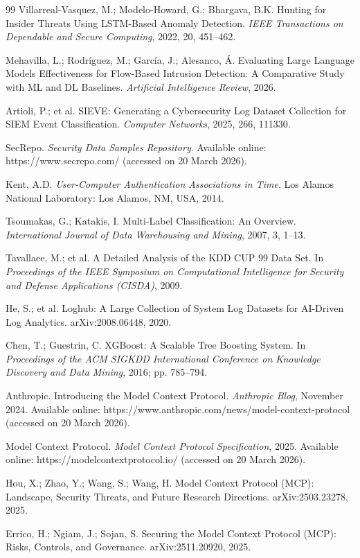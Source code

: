 \documentclass[12pt,oneside]{report}
\begin{document}
\begin{thebibliography}{99}
Villarreal-Vasquez, M.; Modelo-Howard, G.; Bhargava, B.K. Hunting for Insider Threats Using LSTM-Based Anomaly Detection. \textit{IEEE Transactions on Dependable and Secure Computing}, 2022, 20, 451--462.

Mehavilla, L.; Rodr\'{i}guez, M.; Garc\'{i}a, J.; Alesanco, \'{A}. Evaluating Large Language Models Effectiveness for Flow-Based Intrusion Detection: A Comparative Study with ML and DL Baselines. \textit{Artificial Intelligence Review}, 2026.

Artioli, P.; et al. SIEVE: Generating a Cybersecurity Log Dataset Collection for SIEM Event Classification. \textit{Computer Networks}, 2025, 266, 111330.

SecRepo. \textit{Security Data Samples Repository}. Available online: https://www.secrepo.com/ (accessed on 20 March 2026).

Kent, A.D. \textit{User-Computer Authentication Associations in Time}. Los Alamos National Laboratory: Los Alamos, NM, USA, 2014.

Tsoumakas, G.; Katakis, I. Multi-Label Classification: An Overview. \textit{International Journal of Data Warehousing and Mining}, 2007, 3, 1--13.

Tavallaee, M.; et al. A Detailed Analysis of the KDD CUP 99 Data Set. In \textit{Proceedings of the IEEE Symposium on Computational Intelligence for Security and Defense Applications (CISDA)}, 2009.

He, S.; et al. Loghub: A Large Collection of System Log Datasets for AI-Driven Log Analytics. arXiv:2008.06448, 2020.

Chen, T.; Guestrin, C. XGBoost: A Scalable Tree Boosting System. In \textit{Proceedings of the ACM SIGKDD International Conference on Knowledge Discovery and Data Mining}, 2016; pp. 785--794.

Anthropic. Introducing the Model Context Protocol. \textit{Anthropic Blog}, November 2024. Available online: https://www.anthropic.com/news/model-context-protocol (accessed on 20 March 2026).

Model Context Protocol. \textit{Model Context Protocol Specification}, 2025. Available online: https://modelcontextprotocol.io/ (accessed on 20 March 2026).

Hou, X.; Zhao, Y.; Wang, S.; Wang, H. Model Context Protocol (MCP): Landscape, Security Threats, and Future Research Directions. arXiv:2503.23278, 2025.

Errico, H.; Ngiam, J.; Sojan, S. Securing the Model Context Protocol (MCP): Risks, Controls, and Governance. arXiv:2511.20920, 2025.

\end{thebibliography}
\end{document}
